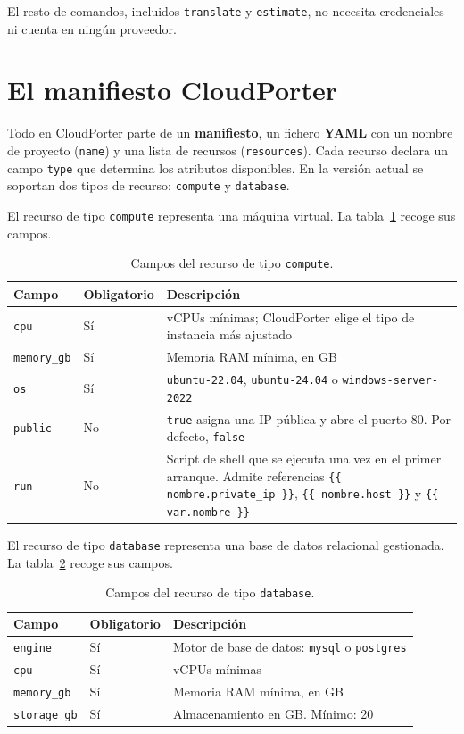El resto de comandos, incluidos \texttt{translate} y \texttt{estimate}, no necesita credenciales
ni cuenta en ningún proveedor.

\section*{El manifiesto CloudPorter}

Todo en CloudPorter parte de un \textbf{manifiesto}, un fichero \textbf{YAML} con un nombre de
proyecto (\texttt{name}) y una lista de recursos (\texttt{resources}). Cada recurso declara un
campo \texttt{type} que determina los atributos disponibles. En la versión actual se soportan dos
tipos de recurso: \texttt{compute} y \texttt{database}.

El recurso de tipo \texttt{compute} representa una máquina virtual. La
tabla~\ref{tab:campos-compute} recoge sus campos.

\begin{table}[H]
\centering
\begin{tabular}{llp{7.2cm}}
\hline
\textbf{Campo} & \textbf{Obligatorio} & \textbf{Descripción} \\
\hline
\texttt{cpu}       & Sí & vCPUs mínimas; CloudPorter elige el tipo de instancia más ajustado \\
\texttt{memory\_gb}& Sí & Memoria RAM mínima, en GB \\
\texttt{os}        & Sí & \texttt{ubuntu-22.04}, \texttt{ubuntu-24.04} o \texttt{windows-server-2022} \\
\texttt{public}    & No & \texttt{true} asigna una IP pública y abre el puerto 80. Por defecto, \texttt{false} \\
\texttt{run}       & No & Script de shell que se ejecuta una vez en el primer arranque. Admite referencias \texttt{\{\{ nombre.private\_ip \}\}}, \texttt{\{\{ nombre.host \}\}} y \texttt{\{\{ var.nombre \}\}} \\
\hline
\end{tabular}
\caption{Campos del recurso de tipo \texttt{compute}.}
\label{tab:campos-compute}
\end{table}

El recurso de tipo \texttt{database} representa una base de datos relacional gestionada. La
tabla~\ref{tab:campos-database} recoge sus campos.

\begin{table}[H]
\centering
\begin{tabular}{llp{7.2cm}}
\hline
\textbf{Campo} & \textbf{Obligatorio} & \textbf{Descripción} \\
\hline
\texttt{engine}     & Sí & Motor de base de datos: \texttt{mysql} o \texttt{postgres} \\
\texttt{cpu}        & Sí & vCPUs mínimas \\
\texttt{memory\_gb} & Sí & Memoria RAM mínima, en GB \\
\texttt{storage\_gb}& Sí & Almacenamiento en GB. Mínimo: 20 \\
\hline
\end{tabular}
\caption{Campos del recurso de tipo \texttt{database}.}
\label{tab:campos-database}
\end{table}

